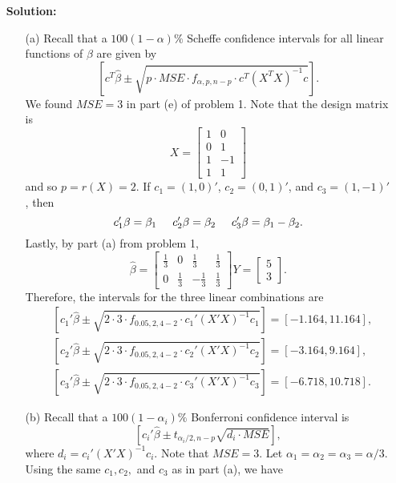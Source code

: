 \documentclass[11pt]{article}
\begin{document}
\begin{itemize}
\item[] {\bf Solution:}
\begin{itemize}
\item[(a)]  Recall that a $100(1-\alpha)\%$ Scheffe confidence intervals for all linear functions of $\beta$ are given by
\[
\left[c^T\widehat{\beta}\pm \sqrt{p\cdot MSE\cdot f_{\alpha,p,n-p}\cdot c^T(X^TX)^{-1}c} \right].
\]
We found $MSE = 3$ in part (e) of problem 1.  Note that the design matrix is
\[
X = \begin{bmatrix}
1 & 0 \\
0 & 1 \\
1 & -1 \\
1 & 1
\end{bmatrix}
\]
and so $p = r(X) = 2$.  If $c_1 = (1,0)'$, $c_2 = (0,1)'$, and $c_3 = (1,-1)'$, then
\[
c_1'\beta = \beta_1 \hspace{5mm} c_2'\beta = \beta_2 \hspace{5mm} c_3'\beta = \beta_1-\beta_2.
\]
Lastly, by part (a) from problem 1, 
\[
\widehat{\beta} = \begin{bmatrix}
\frac{1}{3} & 0 & \frac{1}{3} & \frac{1}{3} \\
0 & \frac{1}{3} & -\frac{1}{3} & \frac{1}{3}
\end{bmatrix}Y = \begin{bmatrix}
5 \\ 3
\end{bmatrix}.
\]
Therefore, the intervals for the three linear combinations are
\begin{align*}
&\left[c_1'\widehat{\beta} \pm \sqrt{2\cdot 3 \cdot f_{0.05, 2, 4 - 2}\cdot c_1'(X'X)^{-1}c_1} \right] = \left[ -1.164, 11.164\right], \\
&\left[c_2'\widehat{\beta} \pm \sqrt{2\cdot 3 \cdot f_{0.05, 2, 4 - 2}\cdot c_2'(X'X)^{-1}c_2} \right] = \left[ -3.164, 9.164\right], \\
&\left[c_3'\widehat{\beta} \pm \sqrt{2\cdot 3 \cdot f_{0.05, 2, 4 - 2}\cdot c_3'(X'X)^{-1}c_3} \right] = \left[ -6.718, 10.718\right].
\end{align*}
\item[(b)]  Recall that a $100(1-\alpha_i)\%$ Bonferroni confidence interval is
\[
\left[ c_i'\widehat{\beta}\pm t_{\alpha_i/2, n-p}\sqrt{d_i\cdot MSE} \right],
\]
where $d_i = c_i'(X'X)^{-1}c_i$.  Note that $MSE = 3$.  Let $\alpha_1 = \alpha_2 = \alpha_3 = \alpha / 3$.  Using the same $c_1,c_2,$ and $c_3$ as in part (a), we have
\begin{align*}

\end{align*}
\end{itemize}
\end{itemize}
\end{document}
